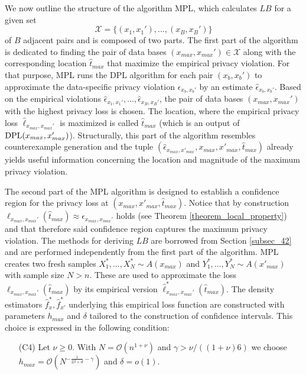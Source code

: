 \documentclass[conference]{IEEEtran}
\begin{document}
We now outline the structure of the algorithm MPL, which 
calculates $LB$ for a given set 
$$
\mathcal{X} = \{ (x_1, x_1'),...,(x_B, x_B') \} 
$$
of $B$ adjacent pairs and 
is composed of two parts.
The first part of the algorithm is dedicated to finding the pair of data bases $(x_{max},x_{max}') \in \mathcal{X}$ along with the corresponding location $\hat t_{max}$ that  maximize the empirical privacy violation. For that purpose, MPL runs the DPL algorithm for each pair $(x_b, x_b')$  to approximate the data-specific privacy violation $\epsilon_{x_b, x_b'}$ by an estimate $\hat \epsilon_{x_b, x_b'}$. Based on the empirical violations $\hat \epsilon_{x_1, x_1'},..., \hat \epsilon_{x_B, x_B'}$, the pair of data bases $(x_{max},x_{max}')$ with the highest privacy loss is chosen. The location, where the empirical privacy loss $\hat \ell_{x_{max},x_{max}'}$ is maximized is called $\hat t_{max}$ (which is an output of $\textnormal{DPL}(x_{max},x'_{max})$). Structurally, this part of the algorithm resembles counterexample generation \cite{StatDP} and the tuple $(\hat \epsilon_{x_{max}, x'_{max}}, x_{max}, x'_{max}, \hat{t}_{max})$ already yields useful information concerning the location and magnitude of the maximum privacy violation.

The second part of the MPL algorithm is designed to establish a confidence region for the privacy loss at  $(x_{max}, x'_{max}, \hat{t}_{max})$. Notice that by construction $\ell_{x_{max},x_{max}'}(\hat t_{max})\approx \epsilon_{x_{max}, x_{max}'}$ holds (see Theorem \ref{theorem_local_property}) and that therefore said confidence region captures the maximum privacy violation. The methods for deriving $LB$ are borrowed from Section \ref{subsec_42} and are performed independently from the first part of the algorithm. MPL creates two fresh samples $X_1^*,...,X_N^* \sim A(x_{max})$ and $Y_1^*,...,Y_N^* \sim A(x'_{max})$ with sample size $N>n$. These are used to approximate the loss  $\ell_{x_{max},x_{max}'}(\hat t_{max})$ by its empirical version $\hat  \ell_{x_{max},x_{max}'}^*(\hat t_{max})$. The density estimators $\hat{f}^*_x, \hat{f}^*_{x'}$ underlying this empirical loss function are constructed with parameters $h_{max}$ and $\delta$ tailored to the construction of confidence intervals. This choice is expressed in the following condition: \\

\begin{itemize}
    \item[(C4)] Let $\nu \ge 0$. With  $N=\mathcal{O}(n^{1+\nu})$ and $\gamma>\nu/((1+\nu)6)$ we choose
    $
    h_{max}  = \mathcal{O}(N^{-\frac{1}{2\beta +d}-\gamma})
    $
    and $ \delta = o(1)$. \\
\end{itemize}
\end{document}
